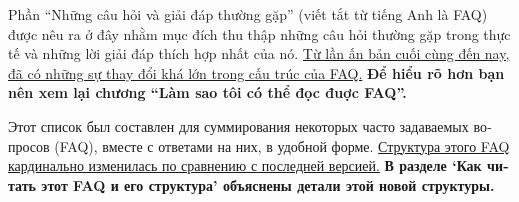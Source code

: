 \documentclass[12pt]{article}
\begin{document}
\begin{CJK}{UTF8}{}
\begin{otherlanguage}{vietnam}
  Phần ``Những câu hỏi và giải đáp thường gặp'' (viết tắt từ tiếng Anh
  là FAQ) được nêu ra ở đây nhằm mục đích thu thập những câu hỏi
  thường gặp trong thực tế và những lời giải đáp thích hợp nhất của
  nó.  \uline{Từ lần ấn bản cuối cùng đến nay, đã có những sự thay đổi
    khá lớn trong cấu trúc của FAQ.}  \textbf{Để hiểu rõ hơn bạn nên
    xem lại chương ``Làm sao tôi có thể đọc đuợc FAQ''.}
\end{otherlanguage}

\begin{otherlanguage}{russian}
  Этот список был составлен для суммирования некоторых часто
  задаваемых вопросов (FAQ), вместе с ответами на них, в удобной
  форме.  \uline{Структура этого FAQ кардинально изменилась по
    сравнению с послед\-ней версией.}  \textbf{В разделе `Как читать
    этот FAQ и его структура' объяснены детали этой новой структуры.}
\end{otherlanguage}

\end{CJK}
\end{document}
